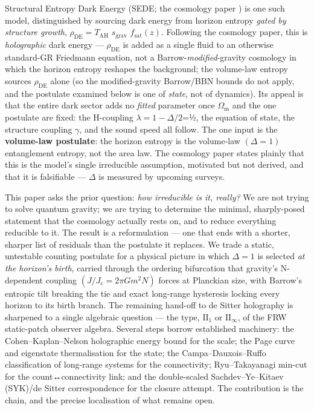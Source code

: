 \documentclass[aps,prd,preprint,nofootinbib,superscriptaddress]{revtex4-2}
\begin{document}
Structural Entropy Dark Energy (SEDE; the cosmology paper
\cite{Pandev:2026cosmology}) is one such model, distinguished by
sourcing dark energy from horizon entropy \emph{gated by structure
growth}, \(\rho _\mathrm{DE} = T_\mathrm{AH}\) \(s_{\mathrm{grav}}\)
\(f_{\mathrm{sat}}(z)\). Following the cosmology paper, this is
\emph{holographic} dark energy --- \(\rho _\mathrm{DE}\) is added as a
single fluid to an otherwise standard-GR Friedmann equation, not a
Barrow-\emph{modified}-gravity cosmology in which the horizon entropy
reshapes the background; the volume-law entropy sources
\(\rho _\mathrm{DE}\) alone (so the modified-gravity Barrow/BBN bounds
do not apply, and the postulate examined below is one of \emph{state},
not of dynamics). Its appeal is that the entire dark sector adds no
\emph{fitted} parameter once \(\Omega _{\mathrm{m}}\) and the one
postulate are fixed: the H-coupling \(\lambda  = 1-\Delta /2\)=½, the
equation of state, the structure coupling \(\gamma\), and the sound
speed all follow. The one input is the \textbf{volume-law postulate}:
the horizon entropy is the volume-law \((\Delta  = 1)\) entanglement
entropy, not the area law. The cosmology paper states plainly that this
is the model's single irreducible assumption, motivated but not derived,
and that it is falsifiable --- \(\Delta\) is measured by upcoming
surveys.

This paper asks the prior question: \emph{how irreducible is it,
really?} We are not trying to solve quantum gravity; we are trying to
determine the minimal, sharply-posed statement that the cosmology
actually rests on, and to reduce everything reducible to it. The result
is a reformulation --- one that ends with a shorter, sharper list of
residuals than the postulate it replaces. We trade a static, untestable
counting postulate for a physical picture in which \(\Delta  = 1\) is
selected \emph{at the horizon's birth}, carried through the ordering
bifurcation that gravity's N-dependent coupling
\((J/J_{\mathrm{c}} = 2\pi Gm^{2}N)\) forces at Planckian size, with
Barrow's entropic tilt breaking the tie and exact long-range hysteresis
locking every horizon to its birth branch. The remaining hand-off to de
Sitter holography is sharpened to a single algebraic question --- the
type, \(\mathrm{II}_{1}\) or \(\mathrm{II}_\infty\), of the FRW
static-patch observer algebra. Several steps borrow established
machinery: the Cohen--Kaplan--Nelson holographic energy bound
\cite{Cohen:1998zx} for the scale; the Page curve and eigenstate
thermalisation for the state; the Campa--Dauxois--Ruffo classification
of long-range systems \cite{Campa:2009jxa} for the connectivity;
Ryu--Takayanagi min-cut for the count↔connectivity link; and the
double-scaled Sachdev--Ye--Kitaev (SYK)/de Sitter correspondence
\cite{Susskind:2021esx, Narovlansky:2023lfz} for the closure attempt.
The contribution is the chain, and the precise localisation of what
remains open.
\end{document}
